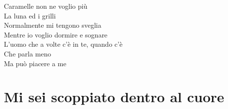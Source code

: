 \documentclass[letter,11pt]{article}
\begin{document}
\begin{multicols}{2}
\noindent Caramelle non ne voglio più \\
La luna ed i grilli \\
Normalmente mi tengono sveglia \\
Mentre io voglio dormire e sognare \\
L'uomo che a volte c'è in te, quando c'è \\
Che parla meno \\
Ma può piacere a me \\

\end{multicols}

\vskip 0.1in
\section*{Mi sei scoppiato dentro al cuore}
\vskip 0.1in
\end{document}
